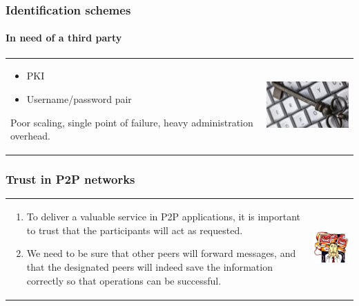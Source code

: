 \documentclass[12pt]{beamer}
\begin{document}
  \begin{frame}
  \frametitle{Identification schemes}
  \framesubtitle{In need of a third party}
  \begin{table}
  \begin{tabular}{p{7cm}p{3cm}}
  \begin{itemize}
      \item PKI
      \item Username/password pair
  \end{itemize}
  
  Poor scaling, single point of failure, heavy administration overhead.
  &
  \vspace{1.5cm}
  \includegraphics[width=4cm]{../../presentacion/img/keyboard_key}\\
  \end{tabular}
  \end{table}
  \end{frame}
  
  \begin{frame}
  \frametitle{Trust in P2P networks}
  \begin{table}
  \begin{tabular}{p{7cm}p{3cm}}
  \begin{enumerate}
      \item To deliver a valuable service in P2P applications, it
  is important to trust that the participants will act as requested.
      \item We need to be sure that other peers will forward
  messages, and that the designated peers will indeed save the information
  correctly so that operations can be successful.
  \end{enumerate}
  &
  \vspace{1.5cm}
  \includegraphics[width=4cm]{../../presentacion/img/malicious}\\
  \end{tabular}
  \end{table}
  \end{frame}
  
\end{document}
